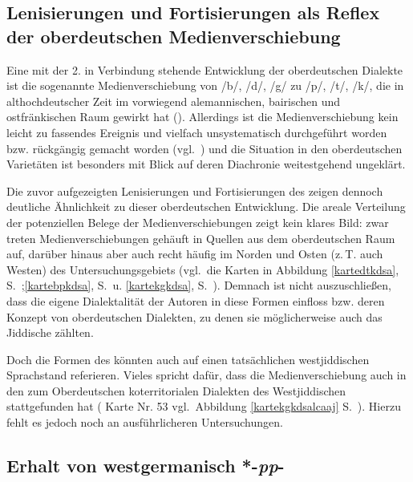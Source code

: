 {   \subsection{Lenisierungen und Fortisierungen als Reflex der oberdeutschen Medienverschiebung}
  Eine mit der 2.  in Verbindung stehende Entwicklung der oberdeutschen Dialekte ist die sogenannte Medienverschiebung von {\ahd} /b/, /d/, /g/ zu /p/, /t/, /k/, die in althochdeutscher Zeit im vorwiegend alemannischen, bairischen und ostfränkischen Raum gewirkt hat (\citealt[131–133]{Szczepaniak2007}). Allerdings ist die Medienverschiebung kein leicht zu fassendes Ereignis und vielfach unsystematisch durchgeführt worden bzw. rückgängig gemacht worden (vgl.\, \citealt[131–133]{Szczepaniak2007}) und die Situation in den oberdeutschen Varietäten ist besonders mit Blick auf deren Diachronie weitestgehend ungeklärt.
 
 Die zuvor aufgezeigten Lenisierungen und Fortisierungen des  zeigen dennoch deutliche Ähnlichkeit zu dieser oberdeutschen Entwicklung. Die areale Verteilung der potenziellen Belege der Medienverschiebungen zeigt kein klares Bild: zwar treten Medienverschiebungen gehäuft in Quellen aus dem oberdeutschen Raum auf, darüber hinaus aber auch recht häufig im Norden und Osten (z.\,T. auch Westen) des Untersuchungsgebiets (vgl.\, die Karten in Abbildung \ref{kartedtkdsa}, S.\, \pageref{kartedtkdsa};\ref{kartebpkdsa}, S.\, \pageref{kartebpkdsa} u. \ref{kartekgkdsa}, S.\, \pageref{kartekgkdsa}). Demnach ist nicht auszuschließen, dass die eigene Dialektalität der Autoren in diese Formen einfloss bzw. deren Konzept von oberdeutschen Dialekten, zu denen sie möglicherweise auch das Jiddische zählten.
 
 Doch die Formen des \hai{{\LiJieins}} könnten auch auf einen tatsächlichen westjiddischen Sprachstand referieren. Vieles spricht dafür, dass die Medienverschiebung auch in den zum Oberdeutschen koterritorialen Dialekten des Westjiddischen stattgefunden hat ( Karte Nr. 53 vgl.\, Abbildung \ref{kartekgkdsalcaaj} S.\, \pageref{kartekgkdsalcaaj}). Hierzu fehlt es jedoch noch an ausführlicheren Untersuchungen.
 
  \subsection{Erhalt von westgermanisch *-\textit{pp}-}

}
